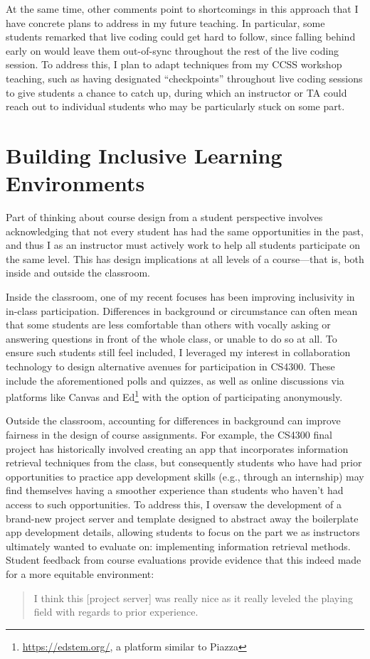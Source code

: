 \documentclass[12pt,letterpaper]{article}
\newcommand\interactionimprove\lainteractionend
\newcommand\interactionimprove\geninteractionend
\begin{document}
At the same time, other comments point to shortcomings in this approach that I have concrete plans to address in my future teaching.
In particular, some students remarked that live coding could get hard to follow, since falling behind early on would leave them out-of-sync throughout the rest of the live coding session.
To address this, I plan to adapt techniques from my CCSS workshop teaching, such as having designated ``checkpoints'' throughout live coding sessions to give students a chance to catch up, during which an instructor
\ifliberalarts
%
\else
or TA
\fi
could reach out to individual students who may be particularly stuck on some part.
\interactionimprove

\section{Building Inclusive Learning Environments}
Part of thinking about course design from a student perspective involves acknowledging that not every student has had the same opportunities in the past, and thus I as an instructor must actively work to help all students participate on the same level.
This has design implications at all levels of a course---that is, both inside and outside the classroom.

Inside the classroom, one of my recent focuses has been improving inclusivity in in-class participation.
Differences in background or circumstance can often mean that some students are less comfortable than others with vocally asking or answering questions in front of the whole class, or unable to do so at all.
To ensure such students still feel included, I leveraged my interest in collaboration technology to design alternative avenues for participation in CS4300.
These include the aforementioned polls and quizzes, as well as online discussions via platforms like Canvas and Ed\footnote{\url{https://edstem.org/}, a platform similar to Piazza} with the option of participating anonymously.

Outside the classroom, accounting for differences in background can improve fairness in the design of course assignments.
For example, the CS4300 final project has historically involved creating an app that incorporates information retrieval techniques from the class, but consequently students who have had prior opportunities to practice app development skills (e.g., through an internship) may find themselves having a smoother experience than students who haven't had access to such opportunities.
To address this, I oversaw the development of a brand-new project server and template designed to abstract away the boilerplate app development details, allowing students to focus on the part we as instructors ultimately wanted to evaluate on: implementing information retrieval methods.
Student feedback from course evaluations provide evidence that this indeed made for a more equitable environment:
\begin{quote}
I think this [project server] was really nice as it really leveled the playing field with regards to prior experience.
\end{quote}
\end{document}
